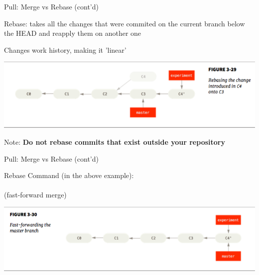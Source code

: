 \documentclass[hyperref,compress,handout,9pt,usepdftitle=false]{beamer}
\begin{document}
\begin{frame}{Pull: Merge vs Rebase (cont'd)}
	\begin{witemize}
		\item Rebase: takes all the changes that were commited on the current branch below the HEAD and reapply them on another one
		\item Changes work history, making it 'linear' 
		\begin{center}
			\includegraphics[width=1.0\textwidth]{rebase}
		\end{center}
		\item Note: \textbf{Do not rebase commits that exist outside your repository}
		
	\end{witemize}
\end{frame}

\begin{frame}{Pull: Merge vs Rebase (cont'd)}
	\begin{witemize}
		\item Rebase Command (in the above example): \\
		\\
		 (fast-forward merge)
		\begin{center}
			\includegraphics[width=1.0\textwidth]{rebase2}
		\end{center}
		
		
	\end{witemize}
\end{frame}
\end{document}
